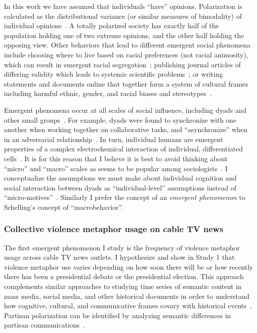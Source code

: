 \documentclass[12pt,letterpaper]{article}
\begin{document}
In this work we have assumed that individuals ``have'' opinions. 
Polarization is calculated 
as the distributional variance (or similar measures of bimodality) 
of individual opinions~\cite{Bramson2016}. A totally polarized society has
exactly half of the population holding one of two extreme opinions, and the
other half holding the opposing view. 
Other behaviors that lead to different emergent social phenomena 
include choosing where to live based on racial preferences (not racial animosity), 
which can result in emergent racial segregation~\cite{Schelling1971}; publishing journal 
articles of differing validity which leads to systemic scientific problems~\cite{Smaldino2019};
or writing statements and documents online that together form a system of 
cultural frames including harmful ethnic, gender, and racial biases and 
stereotypes~\cite{Caliskan2017,Garg2018}. 

Emergent phenomena occur at all scales of social influence, 
including dyads and other small groups~\cite{Abney2014a}. 
For example, dyads were found to synchronize with one another when working
together on collaborative tasks, and ``asynchronize'' when in an adversarial 
relationship~\cite{Abney2014,Ramirez-Aristizabal2018,Schloesser2019,Schneider2020,Abney2021}.
In turn, individual humans are emergent properties of a complex electrochemical
interaction of individual, differentiated cells~\cite{Schrodinger2012,Kello2007,Lazer2009}.
It is for this reason that I believe it is best to avoid thinking about
``micro'' and ``macro'' scales as seems to be popular among 
sociologists~\cite{Macy2002}. I conceptualize the assumptions
we must make about individual cognition and social interaction between dyads
as ``individual-level'' assumptions instead of ``micro-motives''~\cite{Schelling2006}.
Similarly I prefer the concept of an 
\emph{emergent phenomenon} to Schelling's concept of ``macrobehavior''.


\subsubsection{Collective violence metaphor usage on cable TV news}

The first emergent phenomenon I study is the frequency of violence metaphor
usage across cable TV news outlets. I hypothesize and show in Study 1 that
violence metaphor use varies depending on how soon there will
be or how recently there has been a presidential debate or the presidential 
election. This approach
complements similar approaches to studying time series of semantic content in
mass media, social media, and other historical documents
in order to understand how cognitive, cultural, and
communicative frames covary with historical 
events~\cite{Nunn2012,Klingenstein2014,Hamilton2016c,Caliskan2017,Barron2018,Garg2018}. 
Partisan polarization can be identified by analyzing semantic differences in partisan
communications~\cite{Gentzkow2019}.
\end{document}
